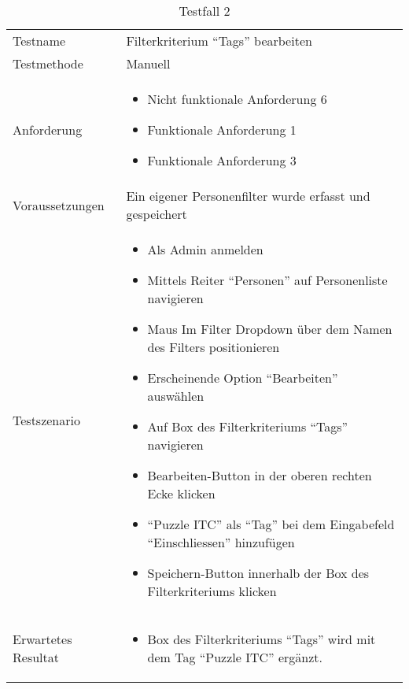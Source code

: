 \begin{table}[h!]
   \begin{tabular}{|L{0.4\textwidth}|L{0.6\textwidth}|}
       \hline
         \\[12pt]
       \hline
        Testname & Filterkriterium ``Tags'' bearbeiten \\
       \hline
       Testmethode & Manuell \\
       \hline
        Anforderung & 
        \begin{itemize}
         \item Nicht funktionale Anforderung 6
         \item Funktionale Anforderung 1
         \item Funktionale Anforderung 3
         \end{itemize}  \\
       \hline
       Voraussetzungen & Ein eigener Personenfilter wurde erfasst und gespeichert \\
       \hline
       Testszenario & 
       \begin{itemize}
         \item Als Admin anmelden
         \item Mittels Reiter ``Personen'' auf Personenliste navigieren
         \item Maus Im Filter Dropdown über dem Namen des Filters positionieren
         \item Erscheinende Option ``Bearbeiten'' auswählen
         \item Auf Box des Filterkriteriums ``Tags'' navigieren
         \item Bearbeiten-Button in der oberen rechten Ecke klicken
         \item ``Puzzle ITC'' als ``Tag'' bei dem Eingabefeld ``Einschliessen'' hinzufügen
         \item Speichern-Button innerhalb der Box des Filterkriteriums klicken
       \end{itemize} \\
       \hline
       Erwartetes Resultat & 
       \begin{itemize}
         \item Box des Filterkriteriums ``Tags'' wird mit dem Tag ``Puzzle ITC'' ergänzt.
      \end{itemize} \\
      \hline
     \end{tabular}
     \caption{Testfall 2}
\end{table}

